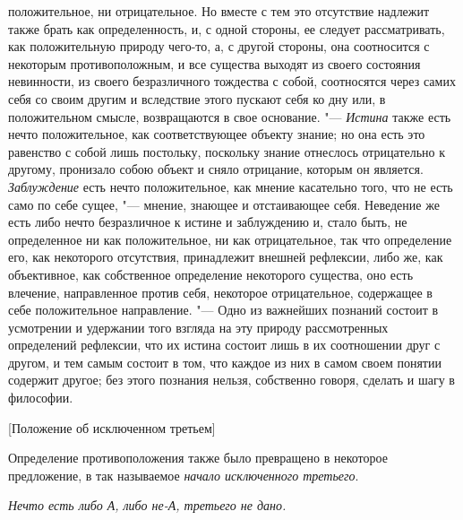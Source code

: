 положительное, ни отрицательное. Но вместе с тем это отсутствие надлежит
также брать как определенность, и, с одной стороны, ее следует
рассматривать, как положительную природу чего-то, а, с другой стороны, она
соотносится с некоторым противоположным, и все существа выходят из своего
состояния невинности, из своего безразличного тождества с собой,
соотносятся через самих себя со своим другим и вследствие этого пускают
себя ко дну или, в положительном смысле, возвращаются в свое
основание. "--- {\em Истина} также есть нечто положительное, как
соответствующее объекту знание; но она есть это равенство с собой лишь
постольку, поскольку знание отнеслось отрицательно к другому, пронизало
собою объект и сняло отрицание, которым он является.
{\em Заблуждение} есть нечто положительное, как мнение
касательно того, что не есть само по себе сущее, "--- мнение, знающее и
отстаивающее себя. Неведение же есть либо нечто безразличное к истине и
заблуждению и, стало быть, не определенное ни как положительное, ни как
отрицательное, так что определение его, как некоторого отсутствия,
принадлежит внешней рефлексии, либо же, как объективное, как собственное
определение некоторого существа, оно есть влечение, направленное против
себя, некоторое отрицательное, содержащее в себе положительное направление.
"--- Одно из важнейших познаний состоит в усмотрении и удержании того взгляда
на эту природу рассмотренных определений рефлексии, что их истина состоит
лишь в их соотношении друг с другом, и тем самым состоит в том, что каждое
из них в самом своем понятии содержит другое; без этого познания нельзя,
собственно говоря, сделать и шагу в философии.

%
  {[Положение об исключенном третьем]}

Определение противоположения также было превращено в некоторое предложение,
в так называемое {\em начало исключенного третьего}.

{\em Нечто есть либо А, либо не-А, третьего не дано.}

